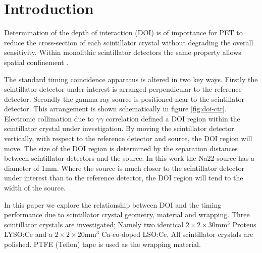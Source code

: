 \section{Introduction} 
Determination of the depth of interaction (DOI) is of importance for PET to reduce the cross-section of each scintillator crystal without degrading the overall sensitivity\cite{Moses_2001}\cite{Humm_Rosenfeld_Del_Guerra_2003}. Within monolithic scintillator detectors the same property allows spatial confinement \cite{am_Borghi_Seifert_Schaart_2013}\cite{Maas_Bruyndonckx_Schaart_2012}.

The standard timing coincidence apparatus is altered in two key ways. Firstly the scintillator detector under interest is arranged perpendicular to the reference detector. Secondly the gamma ray source is positioned near to the scintillator detector. This arrangement is shown schematically in figure \ref{fig:doi-ctr}. Electronic collimation due to $\gamma\gamma$ correlation defined a DOI region within the scintillator crystal under investigation. By moving the scintillator detector vertically, with respect to the reference detector and source, the DOI region will move. The size of the DOI region is determined by the separation distances between scintillator detectors and the source. In this work the Na22 source has a diameter of 1mm. Where the source is much closer to the scintillator detector under interest than to the reference detector, the DOI region will tend to the width of the source.

In this paper we explore the relationship between DOI and the timing performance due to scintillator crystal geometry, material and wrapping. Three scintillator crystals are investigated; Namely two identical $2\times2\times30$mm$^3$ Proteus LYSO:Ce and a $2\times2\times20$mm$^3$ Ca-co-doped LSO:Ce. All scintillator crystals are polished. PTFE (Teflon) tape is used as the wrapping material.

